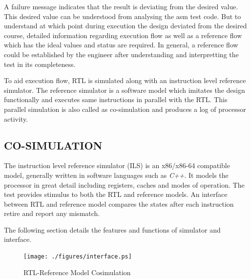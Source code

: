 A failure message indicates that the result is deviating from the desired value. This desired value can be understood from analysing the asm test code. But to understand at which point during execution the design deviated from the desired course, detailed information regarding execution flow as well as a reference flow which has the ideal values and status are required. In general, a reference flow could be established by the engineer after understanding and interpretting the test in its completeness.
 
To aid execution flow, RTL is simulated along with an instruction level reference simulator. The reference simulator is a software model which imitates the design functionally and executes same instructions in parallel with the RTL. This parallel simulation is also called as co-simulation and produces a log of processor activity.


\subsection {CO-SIMULATION}
The instruction level reference simulator (ILS)  is an x86/x86-64 compatible model, generally written in software languages such as {\it C++}. It models the processor in great detail including registers, caches and modes of operation. The test provides stimulus to both the RTL and reference models. An interface between RTL and reference model compares the states after each instruction retire and report any mismatch. 

The following section details the features and functions of simulator and interface. 



\begin{figure}[h]
\centering
\texttt{[image: ./figures/interface.ps]}
\caption{RTL-Reference Model Cosimulation} 
\label{fig:interface.ps}
\end{figure}





